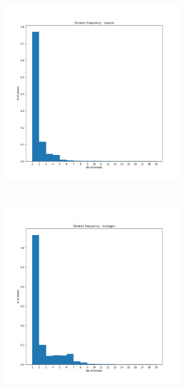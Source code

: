 \begin{figure}
\begin{subfigure}{0.3\textwidth}
    \end{subfigure}
    ~
    \begin{subfigure}{0.3\textwidth}
        \includegraphics[scale=0.28]{images/dataset/strokes_frequency_square.png}
    \end{subfigure}
    ~
    \begin{subfigure}{0.3\textwidth}
        \includegraphics[scale=0.28]{images/dataset/strokes_frequency_hexagon.png}

\end{subfigure}
\end{figure}
